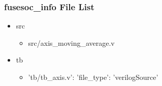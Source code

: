\subsubsection{fusesoc\_info File List}
\begin{itemize}
\item src
	\begin{itemize}
	\item src/axis\_moving\_average.v
	\end{itemize}
\item tb
	\begin{itemize}
	\item {'tb/tb\_axis.v': {'file\_type': 'verilogSource'}}
	\end{itemize}
\end{itemize}
